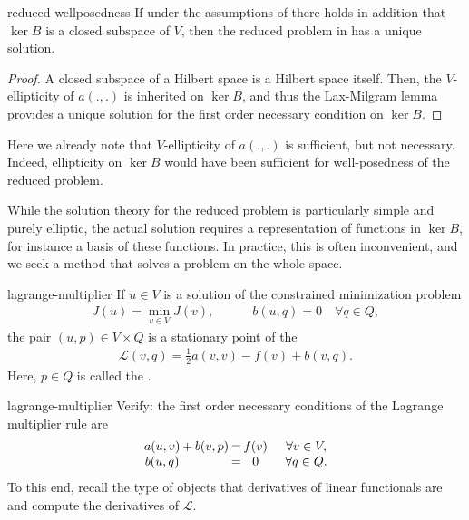 \begin{Lemma}{reduced-wellposedness}
  If under the assumptions of  there
  holds in addition that $\ker B$ is a closed subspace of $V$, then
  the reduced problem in  has a
  unique solution.
\end{Lemma}

\begin{proof}
  A closed subspace of a Hilbert space is a Hilbert space
  itself. Then, the $V$-ellipticity of $a(.,.)$ is inherited on
  $\ker B$, and thus the Lax-Milgram lemma provides a unique solution
  for the first order necessary condition on $\ker B$.
\end{proof}

\begin{remark}
  Here we already note that $V$-ellipticity of $a(.,.)$ is sufficient,
  but not necessary. Indeed, ellipticity on $\ker B$ would have been
  sufficient for well-posedness of the reduced problem.
\end{remark}

\begin{intro}
  While the solution theory for the reduced problem is particularly
  simple and purely elliptic, the actual solution requires a
  representation of functions in $\ker B$, for instance a basis of
  these functions. In practice, this is often inconvenient, and we
  seek a method that solves a problem on the whole space.
\end{intro}

\begin{Theorem}{lagrange-multiplier}
  If $u\in V$ is a solution of the constrained minimization problem
  \begin{gather*}
    J(u) = \min_{v\in V} J(v), \quad\qquad
    b(u,q) = 0 \quad\forall q\in Q,
  \end{gather*}
  the pair $(u,p)\in V\times Q$ is a stationary point of
  the 
  \begin{gather}
    \mathscr L(v,q) = \tfrac12 a(v,v) - f(v) + b(v,q).
  \end{gather}
  Here, $p\in Q$ is called the .
\end{Theorem}

\begin{Problem}{lagrange-multiplier}
  Verify: the first order necessary conditions of the Lagrange
  multiplier rule are
  \begin{gather*}
    \arraycolsep.1em
    \begin{matrix}
      a(u,v) &+& b(v,p) &=& f(v) &\quad&\forall v\in V, \\
      b(u,q) && &=& 0 &&\forall q\in Q.
    \end{matrix}
  \end{gather*}
  To this end, recall the type of objects that derivatives of linear
  functionals are and compute the derivatives of $\mathscr L$.
\end{Problem}

